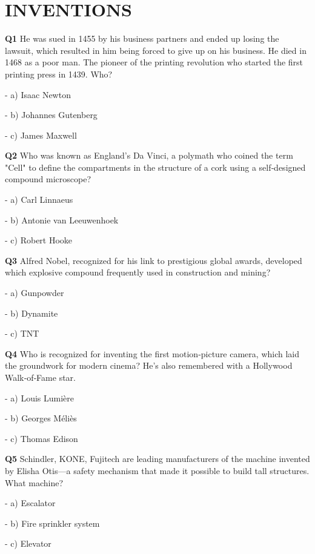 \section{INVENTIONS}

\textbf{Q1} He was sued in 1455 by his business partners and ended up losing the lawsuit, which resulted in him being forced to give up on his business. He died in 1468 as a poor man. The pioneer of the printing revolution who started the first printing press in 1439. Who?\par
\quad - a) Isaac Newton\par
\quad - b) Johannes Gutenberg\par
\quad - c) James Maxwell\par

\textbf{Q2} Who was known as England's Da Vinci, a polymath who coined the term "Cell" to define the compartments in the structure of a cork using a self‑designed compound microscope?\par
\quad - a) Carl Linnaeus\par
\quad - b) Antonie van Leeuwenhoek\par
\quad - c) Robert Hooke\par

\textbf{Q3} Alfred Nobel, recognized for his link to prestigious global awards, developed which explosive compound frequently used in construction and mining?\par
\quad - a) Gunpowder\par
\quad - b) Dynamite\par
\quad - c) TNT\par

\textbf{Q4} Who is recognized for inventing the first motion‑picture camera, which laid the groundwork for modern cinema? He's also remembered with a Hollywood Walk‑of‑Fame star.\par
\quad - a) Louis Lumière\par
\quad - b) Georges Méliès\par
\quad - c) Thomas Edison\par

\textbf{Q5} Schindler, KONE, Fujitech are leading manufacturers of the machine invented by Elisha Otis—a safety mechanism that made it possible to build tall structures. What machine?\par
\quad - a) Escalator\par
\quad - b) Fire sprinkler system\par
\quad - c) Elevator\par

